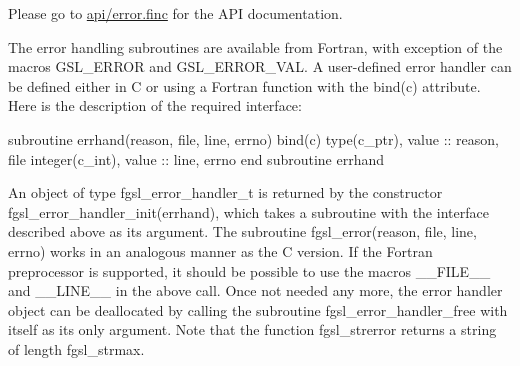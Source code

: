 Please go to \hyperlink{error_8finc}{api/error.\-finc} for the A\-P\-I documentation.

The error handling subroutines are available from Fortran, with exception of the macros {\ttfamily G\-S\-L\-\_\-\-E\-R\-R\-O\-R} and {\ttfamily G\-S\-L\-\_\-\-E\-R\-R\-O\-R\-\_\-\-V\-A\-L}. A user-\/defined error handler can be defined either in C or using a Fortran function with the {\ttfamily bind(c)} attribute. Here is the description of the required interface\-: 
\begin{DoxyPre}
 subroutine errhand(reason, file, line, errno) bind(c)
    type(c\_ptr), value :: reason, file
    integer(c\_int), value :: line, errno
 end subroutine errhand
 \end{DoxyPre}
 An object of type {\ttfamily fgsl\-\_\-error\-\_\-handler\-\_\-t} is returned by the constructor {\ttfamily fgsl\-\_\-error\-\_\-handler\-\_\-init(errhand)}, which takes a subroutine with the interface described above as its argument. The subroutine {\ttfamily fgsl\-\_\-error(reason, file, line, errno)} works in an analogous manner as the C version. If the Fortran preprocessor is supported, it should be possible to use the macros {\ttfamily \-\_\-\-\_\-\-F\-I\-L\-E\-\_\-\-\_\-} and {\ttfamily \-\_\-\-\_\-\-L\-I\-N\-E\-\_\-\-\_\-} in the above call. Once not needed any more, the error handler object can be deallocated by calling the subroutine {\ttfamily fgsl\-\_\-error\-\_\-handler\-\_\-free} with itself as its only argument. Note that the function {\ttfamily fgsl\-\_\-strerror} returns a string of length {\ttfamily fgsl\-\_\-strmax}. 